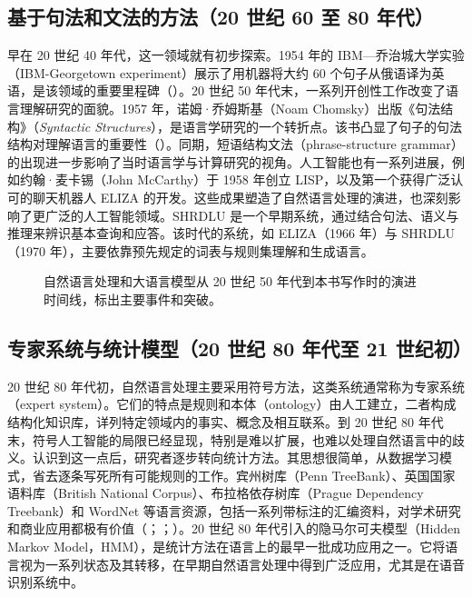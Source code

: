 \subsection{基于句法和文法的方法（20 世纪 60 至 80 年代）}
早在 20 世纪 40 年代，这一领域就有初步探索。1954 年的 IBM—乔治城大学实验（IBM-Georgetown experiment）展示了用机器将大约 60 个句子从俄语译为英语，是该领域的重要里程碑（）。20 世纪 50 年代末，一系列开创性工作改变了语言理解研究的面貌。1957 年，诺姆·乔姆斯基（Noam Chomsky）出版《句法结构》（\textit{Syntactic Structures}），是语言学研究的一个转折点。该书凸显了句子的句法结构对理解语言的重要性（）。同期，短语结构文法（phrase-structure grammar）的出现进一步影响了当时语言学与计算研究的视角。人工智能也有一系列进展，例如约翰·麦卡锡（John McCarthy）于 1958 年创立 LISP，以及第一个获得广泛认可的聊天机器人 ELIZA 的开发。这些成果塑造了自然语言处理的演进，也深刻影响了更广泛的人工智能领域。SHRDLU 是一个早期系统，通过结合句法、语义与推理来辨识基本查询和应答。该时代的系统，如 ELIZA（1966 年）与 SHRDLU（1970 年），主要依靠预先规定的词表与规则集理解和生成语言。

\begin{figure}[!htbp]
\centering

\caption{自然语言处理和大语言模型从 20 世纪 50 年代到本书写作时的演进时间线，标出主要事件和突破。}
\label{fig:ch01-timeline}
\end{figure}

\subsection{专家系统与统计模型（20 世纪 80 年代至 21 世纪初）}
20 世纪 80 年代初，自然语言处理主要采用符号方法，这类系统通常称为专家系统（expert system）。它们的特点是规则和本体（ontology）由人工建立，二者构成结构化知识库，详列特定领域内的事实、概念及相互联系。到 20 世纪 80 年代末，符号人工智能的局限已经显现，特别是难以扩展，也难以处理自然语言中的歧义。认识到这一点后，研究者逐步转向统计方法。其思想很简单，从数据学习模式，省去逐条写死所有可能规则的工作。宾州树库（Penn TreeBank）、英国国家语料库（British National Corpus）、布拉格依存树库（Prague Dependency Treebank）和 WordNet 等语言资源，包括一系列带标注的汇编资料，对学术研究和商业应用都极有价值（；；）。20 世纪 80 年代引入的隐马尔可夫模型（Hidden Markov Model，HMM），是统计方法在语言上的最早一批成功应用之一。它将语言视为一系列状态及其转移，在早期自然语言处理中得到广泛应用，尤其是在语音识别系统中。

